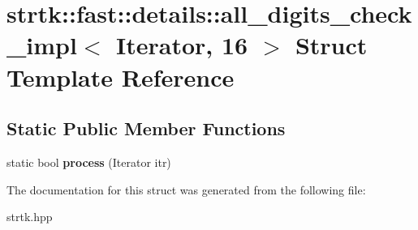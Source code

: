 \hypertarget{structstrtk_1_1fast_1_1details_1_1all__digits__check__impl_3_01Iterator_00_0116_01_4}{\section{strtk\-:\-:fast\-:\-:details\-:\-:all\-\_\-digits\-\_\-check\-\_\-impl$<$ Iterator, 16 $>$ Struct Template Reference}
\label{structstrtk_1_1fast_1_1details_1_1all__digits__check__impl_3_01Iterator_00_0116_01_4}
}
\subsection*{Static Public Member Functions}
\begin{DoxyCompactItemize}
\item 
\hypertarget{structstrtk_1_1fast_1_1details_1_1all__digits__check__impl_3_01Iterator_00_0116_01_4_a44b235d4e16a0d5f4b53fc49d2cc8470}{static bool {\bfseries process} (Iterator itr)}\label{structstrtk_1_1fast_1_1details_1_1all__digits__check__impl_3_01Iterator_00_0116_01_4_a44b235d4e16a0d5f4b53fc49d2cc8470}

\end{DoxyCompactItemize}


The documentation for this struct was generated from the following file\-:\begin{DoxyCompactItemize}
\item 
strtk.\-hpp\end{DoxyCompactItemize}
